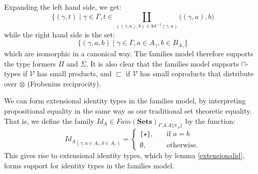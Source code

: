 Expanding the left hand side, we get:
\[
  \{(\gamma, t) \; | \; \gamma \in \Gamma, t \in \coprod_{((\gamma, a), b) \in \text{fst}^{-1}(\gamma, a)}\Big ((\gamma, a), b\Big)
\]
while the right hand side is the set:
\[
  \{(\gamma, a, b) \; | \; \gamma \in \Gamma, a \in A_\gamma, b \in B_{A_\gamma}\}
\]
which are isomorphic in a canonical way. The families model therefore supports the type formers $\Pi$ and $\Sigma$. It is also clear that the families model supports $\sqcap$-types if $\mathcal{V}$ has small products, and $\sqsubset$ if $\mathcal{V}$ has small coproducts that distribute over $\otimes$ (Frobenius reciprocity).

We can form extensional identity types in the families model, by interpreting propositional equality in the same way as our traditional set theoretic equality. That is, we define the family $Id_A \in Fam(\mathbf{Sets})_{\Gamma.A.A\{\pi_A\}}$ by the function:
\[
  {Id_A}_{(\gamma, a \in A_\gamma, b \in A_\gamma)} = \begin{cases} \{ \star \}, &\quad \text{if } a = b\\
  \emptyset, &\quad \text{otherwise.}
    \end{cases}
\]
This gives rise to extensional identity types, which by lemma \ref{extensionalid}, forms support for identity types in the families model.

